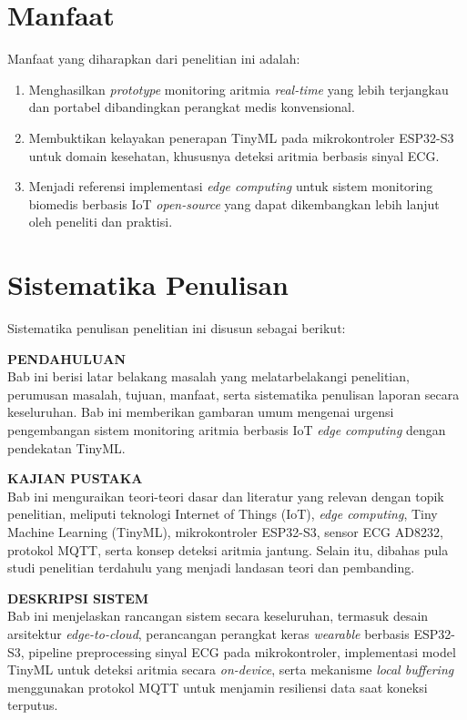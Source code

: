 \section{Manfaat}
\label{sec:manfaat}

Manfaat yang diharapkan dari penelitian ini adalah:
\begin{enumerate}
  \item Menghasilkan \emph{prototype} monitoring aritmia \textit{real-time} yang lebih terjangkau dan portabel dibandingkan perangkat medis konvensional.
  \item Membuktikan kelayakan penerapan TinyML pada mikrokontroler ESP32-S3 untuk domain kesehatan, khususnya deteksi aritmia berbasis sinyal ECG.
  \item Menjadi referensi implementasi \textit{edge computing} untuk sistem monitoring biomedis berbasis IoT \textit{open-source} yang dapat dikembangkan lebih lanjut oleh peneliti dan praktisi.
\end{enumerate}

\section{Sistematika Penulisan}
\label{sec:sistematika}

Sistematika penulisan penelitian ini disusun sebagai berikut:

\noindent
\textbf{PENDAHULUAN}\\
\hspace*{1.5cm} Bab ini berisi latar belakang masalah yang melatarbelakangi penelitian, perumusan masalah, tujuan, manfaat, serta sistematika penulisan laporan secara keseluruhan. Bab ini memberikan gambaran umum mengenai urgensi pengembangan sistem monitoring aritmia berbasis IoT \textit{edge computing} dengan pendekatan TinyML.

\noindent
\textbf{KAJIAN PUSTAKA}\\
\hspace*{1.5cm} Bab ini menguraikan teori-teori dasar dan literatur yang relevan dengan topik penelitian, meliputi teknologi Internet of Things (IoT), \textit{edge computing}, Tiny Machine Learning (TinyML), mikrokontroler ESP32-S3, sensor ECG AD8232, protokol MQTT, serta konsep deteksi aritmia jantung. Selain itu, dibahas pula studi penelitian terdahulu yang menjadi landasan teori dan pembanding.

\noindent
\textbf{DESKRIPSI SISTEM}\\
\hspace*{1.5cm} Bab ini menjelaskan rancangan sistem secara keseluruhan, termasuk desain arsitektur \textit{edge-to-cloud}, perancangan perangkat keras \textit{wearable} berbasis ESP32-S3, pipeline preprocessing sinyal ECG pada mikrokontroler, implementasi model TinyML untuk deteksi aritmia secara \textit{on-device}, serta mekanisme \textit{local buffering} menggunakan protokol MQTT untuk menjamin resiliensi data saat koneksi terputus.

